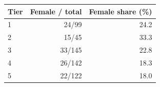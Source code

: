 \begin{tabular}{lrr}
\toprule
Tier & Female / total & Female share (\%) \\
\midrule
1 & 24/99 & 24.2 \\
2 & 15/45 & 33.3 \\
3 & 33/145 & 22.8 \\
4 & 26/142 & 18.3 \\
5 & 22/122 & 18.0 \\
\bottomrule
\end{tabular}

